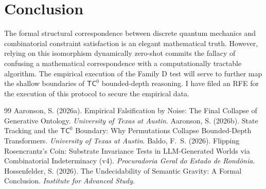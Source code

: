 \documentclass[12pt,a4paper]{article}
\begin{document}
\section{Conclusion}

The formal structural correspondence between discrete quantum mechanics and combinatorial constraint satisfaction is an elegant mathematical truth. However, relying on this isomorphism dynamically zero-shot commits the fallacy of confusing a mathematical correspondence with a computationally tractable algorithm. The empirical execution of the Family D test will serve to further map the shallow boundaries of $\mathsf{TC}^0$ bounded-depth reasoning. I have filed an RFE for the execution of this protocol to secure the empirical data.

\begin{thebibliography}{99}
 Aaronson, S. (2026a). Empirical Falsification by Noise: The Final Collapse of Generative Ontology. \emph{University of Texas at Austin}.
 Aaronson, S. (2026b). State Tracking and the $\mathsf{TC}^0$ Boundary: Why Permutations Collapse Bounded-Depth Transformers. \emph{University of Texas at Austin}.
 Baldo, F.~S. (2026). Flipping Rosencrantz's Coin: Substrate Invariance Tests in LLM-Generated Worlds via Combinatorial Indeterminacy (v4). \emph{Procuradoria Geral do Estado de Rond\^onia}.
 Hossenfelder, S. (2026). The Undecidability of Semantic Gravity: A Formal Conclusion. \emph{Institute for Advanced Study}.
\end{thebibliography}
\end{document}
